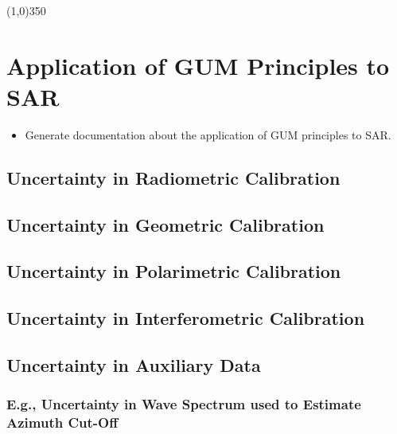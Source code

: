 \documentclass[pdftex,12pt,a4paper,oneside]{article}
\numberwithin{equation}{section} %
\begin{document}


\tableofcontents
\vspace{2cm}

\begin{center}
\line(1,0){350}
\end{center}

\newpage



\section{Application of GUM Principles to SAR}

\begin{itemize}
  \item Generate documentation about the application of GUM principles to SAR.
\end{itemize}


\subsection{Uncertainty in Radiometric Calibration}

\subsection{Uncertainty in Geometric Calibration}

\subsection{Uncertainty in Polarimetric Calibration}

\subsection{Uncertainty in Interferometric Calibration}

\subsection{Uncertainty in Auxiliary Data}

\subsubsection{E.g., Uncertainty in Wave Spectrum used to Estimate Azimuth Cut-Off}
\end{document}

